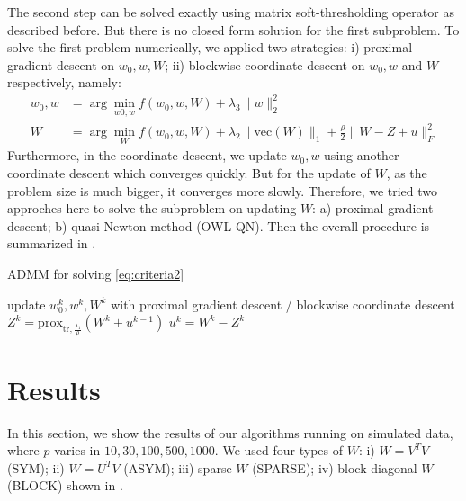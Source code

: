 \documentclass{article}
\newcommand{\tr}{\text{tr}}
\newcommand{\prox}{\text{prox}}
\newcommand{\vecc}{\text{vec}}
\begin{document}
The second step can be solved exactly using matrix soft-thresholding operator as described before. But there is no closed form solution for the first subproblem. To solve the first problem numerically, we applied two strategies: i) proximal gradient descent on $w_0, w, W$; ii) blockwise coordinate descent on $w_0, w$ and $W$ respectively, namely:
\begin{align}
  w_0, w &= \arg\min_{w0, w} f(w_0, w, W) + \lambda_3 \|w\|_2^2 \label{eq:subw0w} \\
  W &= \arg\min_W f(w_0, w, W) + \lambda_2 \|\vecc(W)\|_1 + \frac{\rho}{2} \|W - Z + u\|_F^2 \label{eq:subW}
\end{align}
Furthermore, in the coordinate descent, we update $w_0, w$ using another coordinate descent which converges quickly. But for the update of $W$, as the problem size is much bigger, it converges more slowly. Therefore, we tried two approches here to solve the subproblem on updating $W$: a) proximal gradient descent; b) quasi-Newton method (OWL-QN\cite{andrew2007scalable}). Then the overall procedure is summarized in .

\begin{algorithm} 
  \caption{ADMM for solving \cref{eq:criteria2}}
  \label{algo:admm}
  \begin{algorithmic}[1]
        \State update $w_0^k, w^k, W^k$ with proximal gradient descent / blockwise coordinate descent
      \EndWhile 
      \State $Z^k = \prox_{\tr, \frac{\lambda_1}{\rho}}(W^k + u^{k - 1})$
      \State $u^k = W^k - Z^k$
    \EndFor
  \end{algorithmic}
\end{algorithm}

\section{Results}

In this section, we show the results of our algorithms running on simulated data, where $p$ varies in $10, 30, 100, 500, 1000$.  We used four types of $W$: i) $W = V^TV$ (SYM); ii) $W = U^TV$ (ASYM); iii) sparse $W$ (SPARSE); iv) block diagonal $W$ (BLOCK) shown in .
\end{document}
